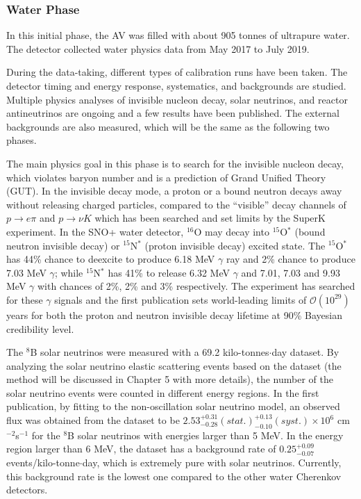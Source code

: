 \subsubsection{Water Phase} 
In this initial phase, the AV was filled with about 905 tonnes of ultrapure water. The detector collected water physics data from May 2017 to July 2019.

During the data-taking, different types of calibration runs have been taken. The detector timing and energy response, systematics, and backgrounds are studied. Multiple physics analyses of invisible nucleon decay, solar neutrinos, and reactor antineutrinos are ongoing and a few results have been published\cite{anderson2019search,anderson2019measurement,anderson2020measurement}. The external backgrounds are also measured, which will be the same as the following two phases.

The main physics goal in this phase is to search for the invisible nucleon decay, which violates baryon number and is a prediction of Grand Unified Theory (GUT). In the invisible decay mode, a proton or a bound neutron decays away without releasing charged particles, compared to the ``visible'' decay channels of $p\to e\pi$ and $p\to\nu K$ which has been searched and set limits by the SuperK experiment. In the SNO+ water detector, $^{16}$O may decay into $^{15}$O$^*$ (bound neutron invisible decay) or $ ^{15}$N$^*$ (proton invisible decay) excited state. The $^{15}$O$^*$ has 44\% chance to deexcite to produce 6.18 MeV $\gamma$ ray and 2\% chance to produce 7.03 MeV $\gamma$; while $^{15}$N$^*$ has 41\% to release 6.32 MeV $\gamma$ and 7.01, 7.03 and 9.93 MeV $\gamma$ with chances of 2\%, 2\% and 3\% respectively. The experiment has searched for these $\gamma$ signals and the first publication sets world-leading limits of $\mathcal{O}(10^{29})$ years for both the proton and neutron invisible decay lifetime at 90\% Bayesian credibility level\cite{anderson2019search}. 

The $^8$B solar neutrinos were measured with a 69.2 kilo-tonnes$\cdot$day dataset. By analyzing the solar neutrino elastic scattering events based on the dataset (the method will be discussed in Chapter 5 with more details), the number of the solar neutrino events were counted in different energy regions. In the first publication\cite{anderson2019measurement}, by fitting to the non-oscillation solar neutrino model, an observed flux was obtained from the dataset to be $2.53^{+0.31}_{-0.28}(stat.)^{+0.13}_{-0.10}(syst.)\times 10^6$ cm$^{-2}$s$^{-1}$ for the $^8$B solar neutrinos with energies larger than 5 MeV. In the energy region larger than 6 MeV, the dataset has a background rate of $0.25^{+0.09}_{-0.07}$ events/kilo-tonne$\cdot$day, which is extremely pure with solar neutrinos. Currently, this background rate is the lowest one compared to the other water Cherenkov detectors\cite{anderson2019measurement}. 

